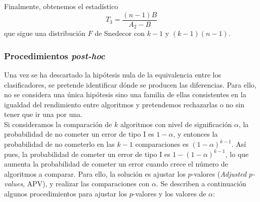 	Finalmente, obtenemos el estadístico
	\[
		T_3 = \frac{(n-1)B}{A_2 - B}
	\]
	que sigue una distribución $F$ de Snedecor con $k-1$ y
$(k-1)(n-1)$.
	

\subsubsection{Procedimientos \textit{post-hoc}}

	Una vez se ha descartado la hipótesis nula de 
la equivalencia entre los clasificadores, se pretende
identificar dónde se producen las diferencias. Para ello,
no se considera una única hipótesis sino una familia 
de ellas consistentes en la igualdad del rendimiento entre 
algoritmos y pretendemos rechazarlas o no sin tener que ir 
una por una.\\
	Si consideramos la comparación de $k$ algoritmos con 
nivel de significación $\alpha$, la probabilidad de no 
cometer un error de tipo I es $1-\alpha$, y entonces la 
probabilidad de no cometerlo en las $k-1$ comparaciones es
$(1-\alpha)^{k-1}$. Así pues, la probabilidad de cometer un
error de tipo I es $1-(1-\alpha)^{k-1}$, lo que aumenta 
la probabilidad de cometer un error cuando crece el número 
de algoritmos a comparar. Para ello, la solución es 
ajustar los $p$-valores (\textit{Adjusted $p$-values}, APV), 
y realizar las comparaciones con $\alpha$. Se describen a continuación algunos procedimientos para ajustar los 
$p$-valores y los valores de $\alpha$:

